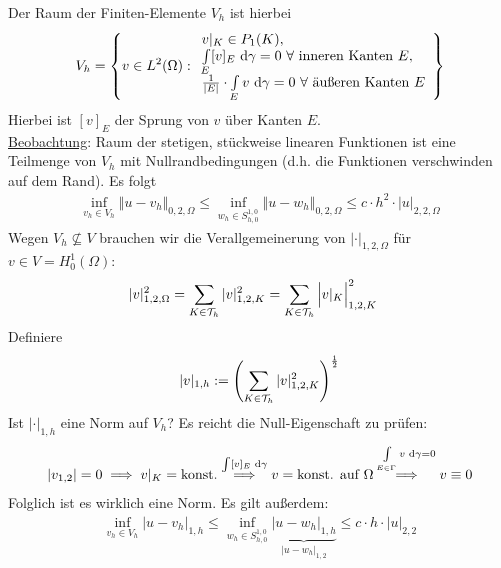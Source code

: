 Der Raum der Finiten-Elemente $V_h$ ist hierbei
\begin{align*}
V_h=\left\lbrace v\in L^2(\Omega):
\begin{array}{l}
v|_K\in P_1(K), \\
\int\limits_E [v]_E\text{ d}\gamma=0~\forall
\text{ inneren Kanten $E$},\\
\frac{1}{|E|}\cdot\int\limits_E v\text{ d}\gamma=0~\forall\text{ äußeren Kanten }E
\end{array}
\right\rbrace
\end{align*}
Hierbei ist $[v]_E$ der Sprung von $v$ über Kanten $E$.\\
\ul{Beobachtung}: Raum der stetigen, stückweise linearen Funktionen ist eine Teilmenge von $V_h$ mit Nullrandbedingungen (d.h. die Funktionen verschwinden auf dem Rand). Es folgt
\begin{align*}
\inf\limits_{v_h\in V_h}\big\Vert u-v_h\big\Vert_{0,2,\Omega}
\leq\inf\limits_{w_h\in S_{h,0}^{1,0}}\big\Vert u-w_h\big\Vert_{0,2,\Omega}
\leq c\cdot h^2\cdot|u|_{2,2,\Omega}
\end{align*}
Wegen $V_h\not\subseteq V$ brauchen wir die Verallgemeinerung von $|\cdot|_{1,2,\Omega}$ für $v\in V=H^1_0(\Omega)$:
\begin{align*}
|v|_{1,2,\Omega}^2
&=\sum\limits_{K\in\mathcal{T}_h}|v|^2_{1,2,K}
=\sum\limits_{K\in\mathcal{T}_h}\Big| v|_K\Big|^2_{1,2,K}
\end{align*}
Definiere
\begin{align*}
|v|_{1,h}:=\left(\sum\limits_{K\in\mathcal{T}_h}|v|^2_{1,2,K}\right)^{\frac{1}{2}}
\end{align*}
Ist $|\cdot|_{1,h}$ eine Norm auf $V_h$? Es reicht die Null-Eigenschaft zu prüfen:
\begin{align*}
|v_{1,2}|=0\implies v|_K=\text{konst.}
\stackrel{\int[v]_E\text{ d}\gamma}{\implies} 
v=\text{konst. auf }\Omega
\stackrel{\int\limits_{E\in\Gamma} v\text{ d}\gamma=0}{\implies}
v\equiv 0
\end{align*}
Folglich ist es wirklich eine Norm. Es gilt außerdem:
\begin{align*}
\inf\limits_{v_h\in V_h}\big|u-v_h\big|_{1,h}
\leq\inf\limits_{w_h\in S_{h,0}^{1,0}}\underbrace{\big|u-w_h\big|_{1,h}}_{|u-w_h|_{1,2}}
\leq c\cdot h\cdot|u|_{2,2}
\end{align*}

